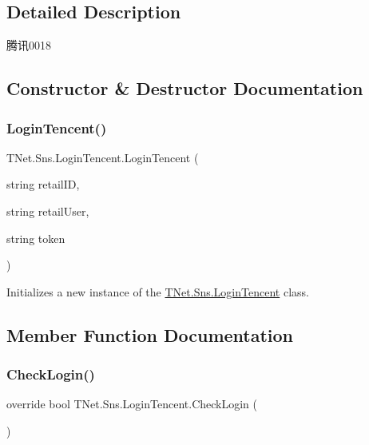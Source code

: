 \subsection{Detailed Description}
腾讯0018 



\subsection{Constructor \& Destructor Documentation}
\mbox{\label{class_t_net_1_1_sns_1_1_login_tencent_a7ca293d0b05129e6292772228324f1c8}} 
\subsubsection{\texorpdfstring{Login\+Tencent()}{LoginTencent()}}
{\footnotesize\ttfamily T\+Net.\+Sns.\+Login\+Tencent.\+Login\+Tencent (\begin{DoxyParamCaption}\item[{string}]{retail\+ID,  }\item[{string}]{retail\+User,  }\item[{string}]{token }\end{DoxyParamCaption})}



Initializes a new instance of the \mbox{\hyperlink{class_t_net_1_1_sns_1_1_login_tencent}{T\+Net.\+Sns.\+Login\+Tencent}} class. 



\subsection{Member Function Documentation}
\mbox{\label{class_t_net_1_1_sns_1_1_login_tencent_a47d0173c57f79fd4c14c5652046b2086}} 
\subsubsection{\texorpdfstring{Check\+Login()}{CheckLogin()}}
{\footnotesize\ttfamily override bool T\+Net.\+Sns.\+Login\+Tencent.\+Check\+Login (\begin{DoxyParamCaption}{ }\end{DoxyParamCaption})\hspace{0.3cm}{\ttfamily [virtual]}}





